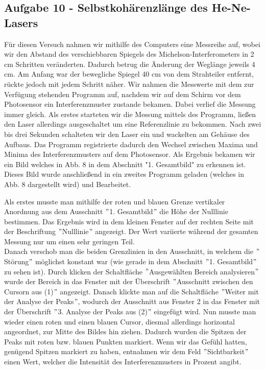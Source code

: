 \subsection*{Aufgabe 10 - Selbstkohärenzlänge des He-Ne-Lasers}
Für diesen Versuch nahmen wir mithilfe des Computers eine Messreihe auf, wobei wir den Abstand des verschiebbaren Spiegels des Michelson-Interferometers in 2 cm Schritten veränderten. Dadurch betrug die Änderung der Weglänge jeweils 4 cm. Am Anfang war der bewegliche Spiegel 40 cm von dem Strahteiler entfernt, rückte jedoch mit jedem Schritt näher. Wir nahmen die Messwerte mit dem zur Verfügung stehenden Programm auf, nachdem wir auf dem Schirm vor dem Photosensor ein Interferenzmuster zustande bekamen. 
Dabei verlief die Messung immer gleich. Als erstes starteten wir die Messung mittels des Programm, ließen den Laser allerdings ausgeschaltet um eine Referenzlinie zu bekommen. Nach zwei bis drei Sekunden schalteten wir den Laser ein und wackelten am Gehäuse des Aufbaus. Das Programm registrierte dadurch den Wechsel zwischen Maxima und Minima des Interferenzmusters auf dem Photosensor. Als Ergebnis bekamen wir ein Bild welches in Abb. 8 in dem Abschnitt "1. Gesamtbild" zu erkennen ist. Dieses Bild wurde anschließend in ein zweites Programm geladen (welches in Abb. 8 dargestellt wird) und Bearbeitet. 


Als erstes musste man mithilfe der roten und blauen Grenze vertikaler Anordnung aus dem Ausschnitt $"$1. Gesamtbild$"$ die Höhe der Nulllinie bestimmen. Das Ergebnis wird in dem kleinen Fenster auf der rechten Seite mit der Beschriftung $"$Nulllinie$"$ angezeigt. Der Wert variierte während der gesamten Messung nur um einen sehr geringen Teil.\\
Danach verschob man die beiden Grenzlinien in den Ausschnitt, in welchem die $"$Störung$"$ möglichst konstant war (wie gerade in dem Abschnitt $"$1. Gesamtbild$"$ zu sehen ist). Durch klicken der Schaltfläche $"$Ausgewählten Bereich analysieren$"$ wurde der Bereich in das Fenster mit der Überschrift $"$Ausschnitt zwischen den Cursorn aus (1)$"$ angezeigt. Danach klickte man auf die Schaltfläche $"$Weiter mit der Analyse der Peaks$"$, wodurch der Ausschnitt aus Fenster 2 in das Fenster mit der Überschrift $"$3. Analyse der Peaks aus (2)$"$ eingefügt wird. Nun musste man wieder einen roten und einen blauen Cursor, diesmal allerdings horizontal angeordnet, zur Mitte des Bildes hin ziehen. Dadurch wurden die Spitzen der Peaks mit roten bzw. blauen Punkten markiert. Wenn wir das Gefühl hatten, genügend Spitzen markiert zu haben, entnahmen wir dem Feld $"$Sichtbarkeit$"$ einen Wert, welcher die Intensität des Interferenzmusters in Prozent angibt.

